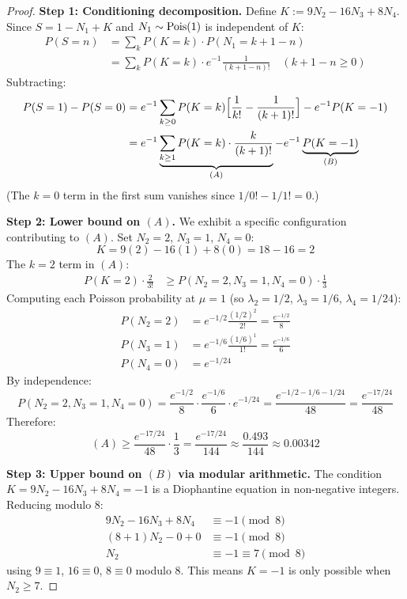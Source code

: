 \documentclass[12pt,a4paper]{article}
\begin{document}
\begin{proof}
\textbf{Step 1: Conditioning decomposition.}
Define $K:=9N_2-16N_3+8N_4$.  Since $S=1-N_1+K$ and $N_1\sim{\rm Pois}(1)$ is independent of $K$:
\begin{align}
  P(S=n) &= \sum_{k} P(K=k)\cdot P(N_1=k+1-n)\\
         &= \sum_{k} P(K=k)\cdot e^{-1}\frac{1}{(k+1-n)!}\quad (k+1-n\geq0)
\end{align}
Subtracting:
\begin{align}
  P(S=1)-P(S=0) &= e^{-1}\sum_{k\geq0}P(K=k)\Bigl[\frac{1}{k!}-\frac{1}{(k+1)!}\Bigr] - e^{-1}P(K=-1)\\
  &= e^{-1}\underbrace{\sum_{k\geq1}P(K=k)\cdot\frac{k}{(k+1)!}}_{(A)} - e^{-1}\underbrace{P(K=-1)}_{(B)}
  \label{eq:decomp}
\end{align}
(The $k=0$ term in the first sum vanishes since $1/0!-1/1!=0$.)

\textbf{Step 2: Lower bound on $(A)$.}
We exhibit a specific configuration contributing to $(A)$.  Set $N_2=2$, $N_3=1$, $N_4=0$:
\begin{equation}
  K = 9(2)-16(1)+8(0) = 18-16 = 2
\end{equation}
The $k=2$ term in $(A)$:
\begin{align}
  P(K=2)\cdot\frac{2}{3!} &\geq P(N_2=2,N_3=1,N_4=0)\cdot\frac{1}{3}
\end{align}
Computing each Poisson probability at $\mu=1$ (so $\lambda_2=1/2$, $\lambda_3=1/6$, $\lambda_4=1/24$):
\begin{align}
  P(N_2=2) &= e^{-1/2}\frac{(1/2)^2}{2!} = \frac{e^{-1/2}}{8}\\
  P(N_3=1) &= e^{-1/6}\frac{(1/6)^1}{1!} = \frac{e^{-1/6}}{6}\\
  P(N_4=0) &= e^{-1/24}
\end{align}
By independence:
\begin{equation}
  P(N_2=2,N_3=1,N_4=0) = \frac{e^{-1/2}}{8}\cdot\frac{e^{-1/6}}{6}\cdot e^{-1/24} = \frac{e^{-1/2-1/6-1/24}}{48} = \frac{e^{-17/24}}{48}
\end{equation}
Therefore:
\begin{equation}
  (A) \geq \frac{e^{-17/24}}{48}\cdot\frac{1}{3} = \frac{e^{-17/24}}{144} \approx \frac{0.493}{144} \approx 0.00342
  \label{eq:lower_A}
\end{equation}

\textbf{Step 3: Upper bound on $(B)$ via modular arithmetic.}
The condition $K=9N_2-16N_3+8N_4=-1$ is a Diophantine equation in non-negative integers.  Reducing modulo $8$:
\begin{align}
  9N_2 - 16N_3 + 8N_4 &\equiv -1\pmod{8}\\
  (8+1)N_2 - 0 + 0 &\equiv -1\pmod{8}\\
  N_2 &\equiv -1 \equiv 7\pmod{8}
  \label{eq:mod8}
\end{align}
using $9\equiv1$, $16\equiv0$, $8\equiv0$ modulo $8$.  This means $K=-1$ is only possible when $N_2\geq7$.


\end{proof}
\end{document}
